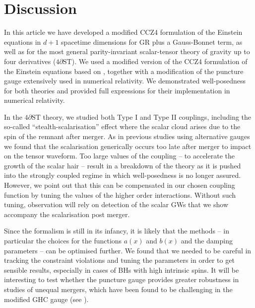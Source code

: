 \documentclass[reprint,aps,amsmath,amssymb,twoside,prd,showkeys,superscriptaddress,nofootinbib]{revtex4-2}
\begin{document}
\section{Discussion}
\label{sec:discussion}
In this article we have developed a modified CCZ4 formulation of the Einstein equations in $d+1$ spacetime dimensions for GR plus a Gauss-Bonnet term, as well as for the most general parity-invariant scalar-tensor theory of gravity up to four derivatives ($4\partial \text{ST}$). We used a modified version of the CCZ4 formulation of the Einstein equations based on \cite{Kovacs:2020pns,Kovacs:2020ywu}, together with a modification of the puncture gauge extensively used in numerical relativity. We demonstrated well-posedness for both theories and provided full expressions for their implementation in numerical relativity. 

In the $4\partial \text{ST}$ theory, we studied both Type I and Type II couplings, including the so-called ``stealth-scalarisation'' effect where the scalar cloud arises due to the spin of the remnant after merger. As in previous studies using alternative gauges we found that the scalarisation generically occurs too late after merger to impact on the tensor waveform. Too large values of the coupling -- to accelerate the growth of the scalar hair -- result in a breakdown of the theory as it is pushed into the strongly coupled regime in which well-posedness is no longer assured. However, we point out that this can be compensated in our chosen coupling function by tuning the values of the higher order interactions. Without such tuning, observation will rely on detection of the scalar GWs that we show accompany the scalarisation post merger.

Since the formalism is still in its infancy, it is likely that the methods -- in particular the choices for the functions $a(x)$ and $b(x)$ and the damping parameters -- can be optimised further. We found that we needed to be careful in tracking the constraint violations and tuning the parameters in order to get sensible results, especially in cases of BHs with high intrinsic spins. It will be interesting to test whether the puncture gauge provides greater robustness in studies of unequal mergers, which have been found to be challenging in the modified GHC gauge (see \cite{Corman:2022xqg}). 
\end{document}
